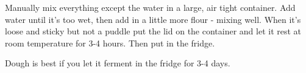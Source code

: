 \begin{recipe}

Manually mix everything except the water in a large, air tight container. Add water until it's too wet, then add in a little more flour - mixing well. When it's loose and sticky but not a puddle put the lid on the container and let it rest at room temperature for 3-4 hours. Then put in the fridge.

Dough is best if you let it ferment in the fridge for 3-4 days.

\end{recipe}

